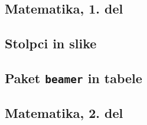 \documentclass{beamer}
\begin{document}
\begin{frame}
    \section[Matematika, 1. del\\\large{Analiza, logika, množice}]{Matematika, 1. del}
\end{frame}



\begin{frame}
    \section{Stolpci in slike}
\end{frame}


\begin{frame}
    \section{Paket \texttt{beamer} in tabele}
\end{frame}


\begin{frame}
    \section[Matematika, 2. del\\\large{Zaporedja, algebra, grupe}]{Matematika, 2. del}
\end{frame}
\end{document}
